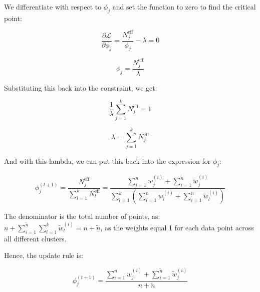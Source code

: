 \begin{answer}
    We differentiate with respect to $\phi_j$ and set the function to zero to find the critical point:

    $$\frac{\partial \mathcal{L}}{\partial \phi_j} = \frac{N_j^{\text{eff}}}{\phi_j} - \lambda = 0$$

    $$\phi_j = \frac{N_j^{\text{eff}}}{\lambda}$$

    Substituting this back into the constraint, we get:

    $$\frac{1}{\lambda} \sum_{j=1}^{k} N_j^{\text{eff}} = 1$$

    $$\lambda = \sum_{j=1}^{k} N_j^{\text{eff}}$$

    And with this lambda, we can put this back into the expression for $\phi_j$:

    $$\phi_j^{(t+1)} = \frac{N_j^{\text{eff}}}{\sum_{l=1}^{k} N_l^{\text{eff}}} = \frac{\sum_{i=1}^{n} w_j^{(i)} + \sum_{i=1}^{\tilde{n}} \tilde{w}_j^{(i)}}{\sum_{l=1}^{k} \left( \sum_{i=1}^{n} w_l^{(i)} + \sum_{i=1}^{\tilde{n}} \tilde{w}_l^{(i)} \right)}$$

    The denominator is the total number of points, as: $n + \sum_{i=1}^{\tilde{n}} \sum_{l=1}^{k} \tilde{w}_l^{(i)} = n + \tilde{n}$, as the weights equal 1 for each data point across all different clusters.

    Hence, the update rule is:

    $$\phi_j^{(t+1)} = \frac{\sum_{i=1}^{n} w_j^{(i)} + \sum_{i=1}^{\tilde{n}} \tilde{w}_j^{(i)}}{n + \tilde{n}}$$
\end{answer}
